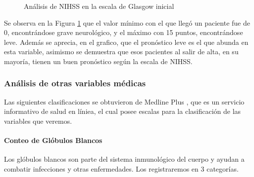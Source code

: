 \begin{center}
    	\begin{figure}[H]
	\centering
	\caption{Análisis de NIHSS en la escala de Glasgow inicial}
	\label{fig:aNISSG}
	\end{figure}
\end{center}
    
    Se observa en la Figura \ref{fig:aNISSG} que el valor mínimo con el que llegó un paciente fue de 0, encontrándose grave neurológico, y el máximo con 15 puntos, encontrándose leve. Además se aprecia, en el grafico, que el pronóstico leve es el que abunda en esta variable, asimismo se demuestra que esos pacientes al salir de alta, en su mayoría, tienen un buen pronóstico según la escala de NIHSS.

    \hypertarget{anuxe1lisis-de-otas-variables-de-muxe9dicas}{%
\subsubsection{Análisis de otras variables médicas}\label{anuxe1lisis-de-otas-variables-de-muxe9dicas}}

Las siguientes clasificaciones se obtuvieron de Medline Plus \cite{med}, que es un servicio informativo de salud en líniea, el cual posee escalas para la clasificación de las variables que veremos.

    \hypertarget{conteo-de-gluxf3bulos-blancos}{%
\paragraph{Conteo de Glóbulos
Blancos}\label{conteo-de-gluxf3bulos-blancos}}

Los glóbulos blancos son parte del sistema inmunológico del cuerpo y
ayudan a combatir infecciones y otras enfermedades. Los registraremos en
3 categorías.

